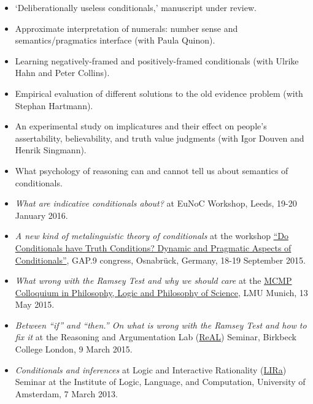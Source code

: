 \documentclass[a4paper,12pt]{article}
\begin{document}
\begin{small}
  \begin{itemize}
   \item `Deliberationally useless conditionals,' manuscript under review.
   \item Approximate interpretation of numerals: number sense and semantics/pragmatics interface (with Paula Quinon).
   \item Learning negatively-framed and positively-framed conditionals (with Ulrike Hahn and Peter Collins).
   \item Empirical evaluation of different solutions to the old evidence problem (with Stephan Hartmann).
   \item An experimental study on implicatures and their effect on people's assertability, believability, and truth value judgments (with Igor Douven and Henrik Singmann).
   \item What psychology of reasoning can and cannot tell us about semantics of conditionals.
  \end{itemize}
  

  \begin{itemize} 
    \item \emph{What are indicative conditionals about?} at EuNoC Workshop, Leeds, 19-20 January 2016.

    \item \emph{A new kind of metalinguistic theory of conditionals} at the workshop \href{http://cms.uni-konstanz.de/what-if/events/workshop-in-osnabrueck-september-2015-p1-and-p7/}{``Do Conditionals have Truth Conditions? Dynamic and Pragmatic Aspects of Conditionals''}, GAP.9 congress, Osnabrück, Germany, 18-19 September 2015.

    \item \emph{What wrong with the Ramsey Test and why we should care} at the \href{http://www.mcmp.philosophie.uni-muenchen.de/events/weekly_talks_new/index.html}{MCMP Colloquium in Philosophy, Logic and Philosophy of Science}, LMU Munich, 13 May 2015.

    \item \emph{Between ``if'' and ``then.'' On what is wrong with the Ramsey Test and how to fix it} at the Reasoning and Argumentation Lab (\href{http://www.bbk.ac.uk/psychology/ral}{ReAL}) Seminar, Birkbeck College London, 9 March 2015.

    \item \emph{Conditionals and inferences} at Logic and Interactive
    Rationality (\href{http://www.illc.uva.nl/lgc/seminar/}{LIRa})
    Seminar at the Institute of Logic, Language, and Computation,
    University of Amsterdam, 7 March 2013.
  

\end{itemize}
\end{small}
\end{document}
